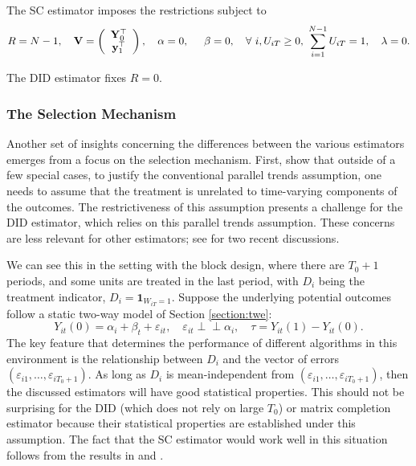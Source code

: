 \documentclass[letterpaper,12pt,leqno]{article}
\newcommand{\bv}{{\bf V}}
\newcommand{\bye}{\mathbf{y}_1}
\newcommand{\indep}{\perp\!\!\!\perp}
\begin{document}
  The SC estimator imposes the restrictions
subject  to
\[R=N-1, \quad \bv=
		\left(
		\begin{array}{cc}
		\mathbf{Y}_0^\top \\
		\bye^\top
		\end{array}\right),\quad
		\alpha=0, \hskip0.5cm \beta=0, \quad
		\forall\ i, U_{iT}\geq 0,\ \sum_{i=1}^{N-1} U_{iT}=1,\quad \lambda=0.
		\]

  
  The DID estimator fixes $R=0$.

\subsubsection{The Selection Mechanism}\label{subsec:selection}

Another set of insights concerning the differences between the various estimators emerges from a focus on the selection mechanism. First, \cite*{ghanem2022selection} show that outside of a few special cases, to justify the conventional parallel trends assumption, one needs to assume that the treatment is unrelated to time-varying components of the outcomes. The restrictiveness of this assumption presents a challenge for the DID estimator, which relies on this  parallel trends assumption. These concerns are less relevant for other estimators; see \citep{arkhangelsky2023synth, viviano} for two recent discussions.

We can see this in the setting with the block design, where there are $T_0+1$ periods, and some units are treated in the last period, with $D_i$ being the treatment indicator, $D_i=\mathbf{1}_{W_{iT}=1}$. Suppose the underlying potential outcomes follow a static two-way model of Section \ref{section:twe}:
\begin{equation*}
    Y_{it}(0) = \alpha_i + \beta_t + \varepsilon_{it},\quad  \varepsilon_{it} \indep \alpha_i, \quad \tau = Y_{it}(1) - Y_{it}(0).
\end{equation*}
The key feature that determines the performance of different algorithms in this environment is the relationship between $D_i$ and the vector of errors $(\varepsilon_{i1},\dots, \varepsilon_{iT_0+1})$. As long as $D_i$ is mean-independent from $(\varepsilon_{i1},\dots, \varepsilon_{iT_0+1})$, then the discussed estimators will have good statistical properties. This should not be surprising for the DID (which does not rely on large $T_0$) or matrix completion estimator because their statistical properties are established under this assumption. The fact that the SC estimator would work well in this situation follows from the results in \citep*{arkhangelsky2021synthetic} and \citep*{arkhangelsky2023synth}. 
\end{document}
